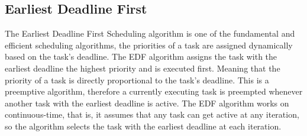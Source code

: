 \documentclass[12pt, conference]{IEEEtran}
\begin{document}
\subsection{Earliest Deadline First}
The Earliest Deadline First Scheduling algorithm is one of the fundamental and efficient scheduling algorithms, the priorities of a task are assigned dynamically based on the task's deadline. The EDF algorithm assigns the task with the earliest deadline the highest priority and is executed first. Meaning that the priority of a task is directly proportional to the task's deadline. This is a preemptive algorithm, therefore a currently executing task is preempted whenever another task with the earliest deadline is active. The EDF algorithm works on continuous-time, that is, it assumes that any task can get active at any iteration, so the algorithm selects the task with the earliest deadline at each iteration. \cite{b6}
\end{document}
